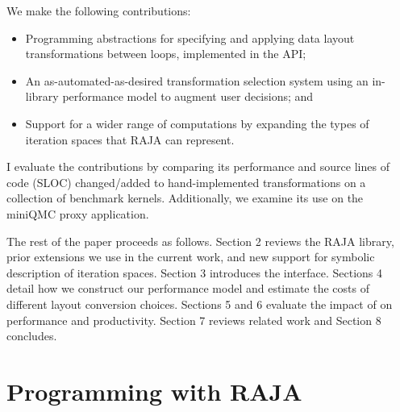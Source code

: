 We make the following contributions:
\begin{itemize}
\item Programming abstractions for specifying and applying data layout transformations between loops, implemented in the \FormatDecisions{} API\@;
\item An as-automated-as-desired transformation selection system using an in-library performance model to augment user decisions; and
\item Support for a wider range of computations by expanding the types of iteration spaces that RAJA can represent.
\end{itemize}
I evaluate the contributions by comparing its performance and source lines of code (SLOC) changed/added to hand-implemented transformations on a collection of benchmark kernels.
Additionally, we examine its use on the miniQMC proxy application.

The rest of the paper proceeds as follows. 
Section 2 reviews the RAJA library, prior extensions we use in the current work, and new support for symbolic description of iteration spaces.
Section 3 introduces the \FormatDecisions{} interface.
Sections 4 detail how we construct our performance model and estimate the costs of different layout conversion choices.
Sections 5 and 6 evaluate the impact of \FormatDecisions{}  on performance and productivity.
Section 7 reviews related work and Section 8 concludes.



\section{Programming with RAJA}\label{sec:kernelObjects}

